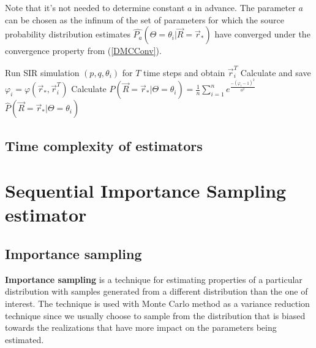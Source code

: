 \documentclass[times, utf8, diplomski]{fer}
\begin{document}
Note that it's not needed to determine constant $a$ in advance. The parameter $a$ can be chosen as the infinum of the set of parameters for which the source probability distribution estimates $\hat{P_a}(\Theta = \theta_i | \vec R = \vec r_*)$ have converged under the convergence property from (\ref{DMCConv}). 

\vspace{5mm}
\begin{algorithm}[H]
  {
    Run SIR simulation $(p, q, \theta_i)$ for $T$ time steps and obtain  
    $\vec r_i^T$\;
    Calculate and save $\varphi_i = \varphi(\vec r_*, \vec r_i^T)$\;
 }
  Calculate $\hat{P}(\vec R = \vec r_* | \Theta = \theta_i) = \frac{1}{n} \sum_{i = 1}^{n} e ^ {\frac{-(\varphi_i -1)^2}{a^2}}$\;
  \Return $\hat{P}(\vec R = \vec r_* | \Theta = \theta_i)$
 \label{DMC_lag}
 \caption{Soft Margin estimation of $P(\vec R = \vec r_* | \Theta = \theta_i)$ for a fixed source $\theta_i$.}
\end{algorithm}
 \AlgoDontDisplayBlockMarkers%

\section{Time complexity of estimators}

\chapter{Sequential Importance Sampling estimator}
\label{IS}
\section{Importance sampling}

\textbf{Importance sampling} is a technique for estimating properties of a particular distribution with samples generated from a different distribution than the one of interest. The technique is used with Monte Carlo method as a variance reduction technique since we usually choose to sample from the distribution that is biased towards the realizations that have more impact on the parameters being estimated.
\end{document}
